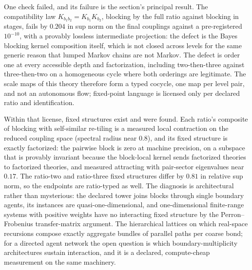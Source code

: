 \documentclass[11pt,letterpaper]{article}
\begin{document}
One check failed, and its failure is the section's principal result. The compatibility law $K_{b_1 b_2} = K_{b_1} K_{b_2}$, blocking by the full ratio against blocking in stages, fails by $0.204$ in sup norm on the final couplings against a pre-registered $10^{-10}$, with a provably lossless intermediate projection: the defect is the Bayes blocking kernel composition itself, which is not closed across levels for the same generic reason that lumped Markov chains are not Markov. The defect is order one at every accessible depth and factorization, including two-then-three against three-then-two on a homogeneous cycle where both orderings are legitimate. The scale maps of this theory therefore form a typed cocycle, one map per level pair, and not an autonomous flow; fixed-point language is licensed only per declared ratio and identification.

Within that license, fixed structures exist and were found. Each ratio's composite of blocking with self-similar re-tiling is a measured local contraction on the reduced coupling space (spectral radius near $0.8$), and its fixed structure is exactly factorized: the pairwise block is zero at machine precision, on a subspace that is provably invariant because the block-local kernel sends factorized theories to factorized theories, and measured attracting with pair-sector eigenvalues near $0.17$. The ratio-two and ratio-three fixed structures differ by $0.81$ in relative sup norm, so the endpoints are ratio-typed as well. The diagnosis is architectural rather than mysterious: the declared tower joins blocks through single boundary agents, its instances are quasi-one-dimensional, and one-dimensional finite-range systems with positive weights have no interacting fixed structure by the Perron--Frobenius transfer-matrix argument. The hierarchical lattices on which real-space recursions compose exactly aggregate bundles of parallel paths per coarse bond; for a directed agent network the open question is which boundary-multiplicity architectures sustain interaction, and it is a declared, compute-cheap measurement on the same machinery.
\end{document}
